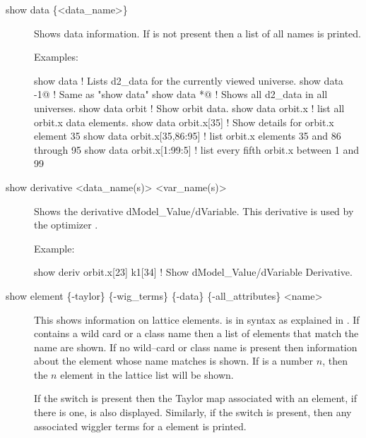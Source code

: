 {{\begin{description}

\item[show data \{<data\_name>\}] \Newline
Shows data information. If  is not
present then a list of all  names is printed.

Examples:
\begin{example}
  show data                   ! Lists d2_data for the currently viewed universe.
  show data -1@               ! Same as "show data"
  show data *@                ! Shows all d2_data in all universes.
  show data orbit             ! Show orbit data.
  show data orbit.x           ! list all orbit.x data elements.
  show data orbit.x[35]       ! Show details for orbit.x element 35
  show data orbit.x[35,86:95] ! list orbit.x elements 35 and 86 through 95
  show data orbit.x[1:99:5]   ! list every fifth orbit.x between 1 and 99  
\end{example}


\item[show derivative <data\_name(s)> <var\_name(s)>] \Newline
Shows the derivative dModel\_Value/dVariable. This derivative is used
by the optimizer .

Example:
\begin{example}
  show deriv orbit.x[23] k1[34] ! Show dModel_Value/dVariable Derivative.
\end{example}


\item[show element \{-taylor\} \{-wig\_terms\} \{-data\} 
                     \{-all\_attributes\} <name>] \Newline
This shows information on lattice elements.  is in
 syntax as explained in . If
 contains a wild card or a class name then a list of
elements that match the name are shown. If no wild--card or class name
is present then information about the element whose name matches
 is shown. If  is a number $n$, then the $n$\Th
element in the lattice list will be shown.

If the  switch is present then the Taylor map associated
with an element, if there is one, is also displayed.  Similarly, if the
 switch is present, then any associated wiggler terms for
a   element is printed.


\end{description}}}
